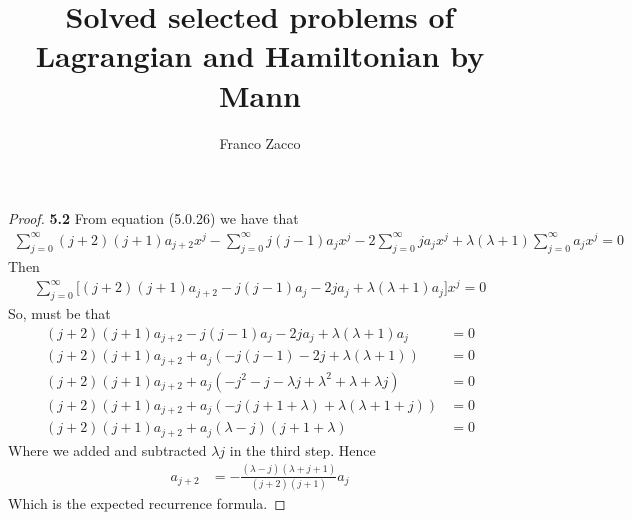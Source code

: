 \documentclass[11pt]{article}
\title{\textbf{Solved selected problems of Lagrangian and Hamiltonian by Mann}}
\author{Franco Zacco}
\date{}
\theoremstyle{definition}
\begin{document}
\maketitle
\thispagestyle{empty}

\begin{proof}{\textbf{5.2}}
From equation (5.0.26) we have that
\begin{align*}
    \sum_{j=0}^\infty (j+2)(j+1)a_{j+2}x^j
    - \sum_{j=0}^\infty j(j-1)a_{j}x^j
    - 2\sum_{j=0}^\infty ja_{j}x^j
    + \lambda(\lambda + 1)\sum_{j=0}^\infty a_{j}x^j
    = 0
\end{align*}
Then
\begin{align*}
    \sum_{j=0}^\infty \bigg[(j+2)(j+1)a_{j+2}
    - j(j-1)a_{j}
    - 2ja_{j}
    + \lambda(\lambda + 1)a_{j}
    \bigg]x^j
    = 0
\end{align*}
So, must be that
\begin{align*}
    (j+2)(j+1)a_{j+2} - j(j-1)a_{j} - 2ja_{j} + \lambda(\lambda + 1)a_{j}
    &= 0\\
    (j+2)(j+1)a_{j+2} + a_j(-j(j-1) - 2j + \lambda(\lambda + 1))
    &= 0\\
    (j+2)(j+1)a_{j+2} + a_j(-j^2 - j - \lambda j + \lambda^2 + \lambda + \lambda j)
    &= 0\\
    (j+2)(j+1)a_{j+2} + a_j(-j(j + 1 + \lambda) + \lambda(\lambda + 1 + j))
    &= 0\\
    (j+2)(j+1)a_{j+2} + a_j(\lambda-j)(j + 1 + \lambda)
    &= 0
\end{align*}
Where we added and subtracted $\lambda j$ in the third step. Hence
\begin{align*}
    a_{j+2} &= - \frac{(\lambda-j)(\lambda + j + 1)}{(j+2)(j+1)}a_j
\end{align*}
Which is the expected recurrence formula.
\end{proof}
\end{document}
